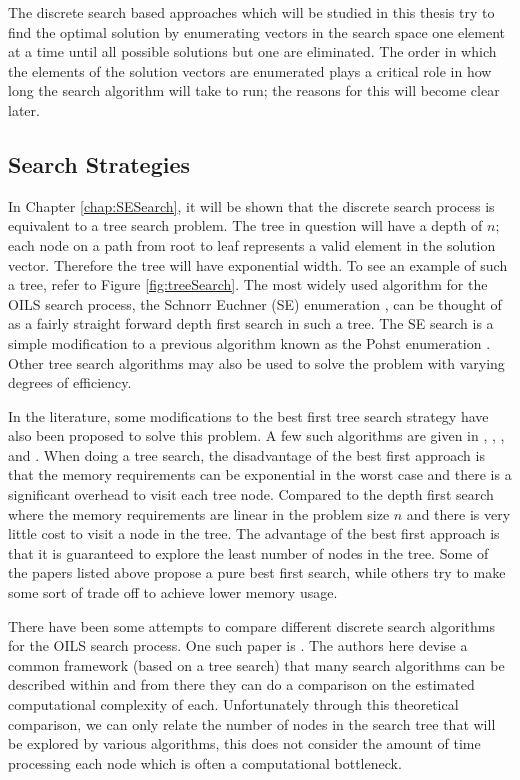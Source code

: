 \documentclass[12pt,Bold,letterpaper]{mcgilletdclass}
\newcommand{\vsp}{\vspace{\baselineskip}}
\begin{document}
The discrete search based approaches which will be studied in this thesis try to find the optimal solution by enumerating vectors in the search space one element at a time until all possible solutions but one are eliminated. The order in which the elements of the solution vectors are enumerated plays a critical role in how long the search algorithm will take to run; the reasons for this will become clear later.

\vsp \subsection{Search Strategies}
In Chapter \ref{chap:SESearch}, it will be shown that the discrete search process is equivalent to a tree search problem. The tree in question will have a depth of $n$; each node on a path from root to leaf represents a valid element in the solution vector. Therefore the tree will have exponential width. To see an example of such a tree, refer to Figure \ref{fig:treeSearch}. The most widely used algorithm for the OILS search process, the Schnorr Euchner (SE) enumeration \cite{SchE94}, can be thought of as a fairly straight forward depth first search in such a tree. The SE search is a simple modification to a previous algorithm known as the Pohst enumeration \cite{Pho81}. Other tree search algorithms may also be used to solve the problem with varying degrees of efficiency.

In the literature, some modifications to the best first tree search strategy have also been proposed to solve this problem. A few such algorithms are given in \cite{MurGDC06}, \cite{XuWZW04}, \cite{FukMU04}, \cite{StuBF07} and \cite{DaiY08}. When doing a tree search, the disadvantage of the best first approach is that the memory requirements can be exponential in the worst case and there is a significant overhead to visit each tree node. Compared to the depth first search where the memory requirements are linear in the problem size $n$ and there is very little cost to visit a node in the tree. The advantage of the best first approach is that it is guaranteed to explore the least number of nodes in the tree. Some of the papers listed above propose a pure best first search, while others try to make some sort of trade off to achieve lower memory usage.

There have been some attempts to compare different discrete search algorithms for the OILS search process. One such paper is \cite{MurGDC06}. The authors here devise a common framework (based on a tree search) that many search algorithms can be described within and from there they can do a comparison on the estimated computational complexity of each. Unfortunately through this theoretical comparison, we can only relate the number of nodes in the search tree that will be explored by various algorithms, this does not consider the amount of time processing each node which is often a computational bottleneck.
\end{document}
